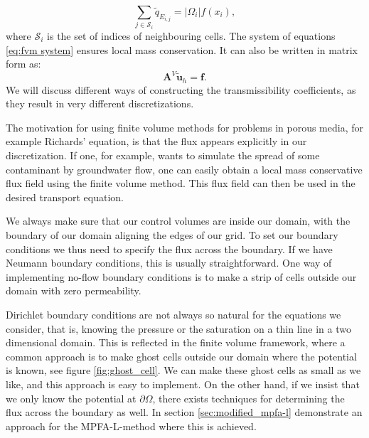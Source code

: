 \documentclass[../Main/main.tex]{subfiles}
\begin{document}
	\begin{equation}\label{eq:fvm system}
		\sum_{j\in \mathcal{S}_i} \tilde{q}_{E_{i,j}} = |\Omega_i|f(x_i),
	\end{equation}
	where $\mathcal{S}_i$ is the set of indices of neighbouring cells.
	The system of equations \eqref{eq:fvm system} ensures local mass conservation. It can also be written in matrix form as:
	\begin{equation}
		\bm{A}^V\tilde{\bm{u}}_h = \bm{f}.
	\end{equation}
	 We will discuss different ways of constructing the transmissibility coefficients, as they result in very different discretizations.
	\par
	The motivation for using finite volume methods for problems in porous media, for example Richards' equation, is that the flux appears explicitly in our discretization. If one, for example, wants to simulate the spread of some contaminant by groundwater flow, one can easily obtain a local mass conservative flux field using the finite volume method. This flux field can then be used in the desired transport equation.
	\par 
	We always make sure that our control volumes are inside our domain, with the boundary of our domain aligning the edges of our grid. To set our boundary conditions we thus need to specify the flux across the boundary. If we have Neumann boundary conditions, this is usually straightforward. One way of implementing no-flow boundary conditions is to make a strip of cells outside our domain with zero permeability. 
	\par
	Dirichlet boundary conditions are not always so natural for the equations we consider, that is, knowing the pressure or the saturation on a thin line in a two dimensional domain. This is reflected in the finite volume framework, where a common approach is to make ghost cells outside our domain where the potential is known, see figure \ref{fig:ghost_cell}. We can make these ghost cells as small as we like, and this approach is easy to implement. On the other hand, if we insist that we only know the potential at $\partial \Omega$, there exists techniques for determining the flux across the boundary as well. In section \ref{sec:modified_mpfa-l} demonstrate an approach for the MPFA-L-method where this is achieved.
\end{document}
